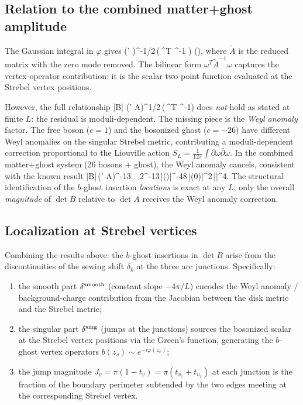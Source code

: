 \documentclass[12pt]{article}
\newcommand{\wt}[1]{\widetilde{#1}}
\begin{document}
\subsection{Relation to the combined matter+ghost amplitude}

The Gaussian integral in $\varphi$ gives
\be
(\det' \wt{A})^{-1/2}\,\exp\!\left(\,\omega^T \wt{A}^{-1} \omega\right)
\times (),
\ee
where $\wt{A}$ is the reduced matrix with the zero mode removed. The bilinear form $\omega^T \wt{A}^{-1}\omega$ captures the vertex-operator contribution: it is the scalar two-point function evaluated at the Strebel vertex positions.

However, the full relationship
\be
|\det B|  (\det' A)^{1/2}\,\exp\!\left(\,\omega^T \wt{A}^{-1}\omega\right)
\ee
does \emph{not} hold as stated at finite $L$: the residual is moduli-dependent. The missing piece is the \emph{Weyl anomaly} factor. The free boson ($c=1$) and the bosonized ghost ($c=-26$) have different Weyl anomalies on the singular Strebel metric, contributing a moduli-dependent correction proportional to the Liouville action $S_L = \frac{1}{12\pi}\int\partial\omega\bar\partial\omega$. In the combined matter+ghost system (26 bosons $+$ ghost), the Weyl anomaly cancels, consistent with the known result
\be
|\det B|\,(\det' A)^{-13} \propto \tau_2^{-13}\,|\eta(\tau)|^{-48}\,|(0)|^2\,|\nu|^4.
\ee
The structural identification of the $b$-ghost insertion \emph{locations} is exact at any $L$; only the overall \emph{magnitude} of $\det B$ relative to $\det A$ receives the Weyl anomaly correction.

\subsection{Localization at Strebel vertices}

Combining the results above: the $b$-ghost insertions in $\det B$ arise from the discontinuities of the sewing shift $\delta_k$ at the three arc junctions. Specifically:
\begin{enumerate}
\item the smooth part $\delta^{\rm smooth}$ (constant slope $-4\pi/L$) encodes the Weyl anomaly / background-charge contribution from the Jacobian between the disk metric and the Strebel metric;
\item the singular part $\delta^{\rm sing}$ (jumps at the junctions) sources the bosonized scalar at the Strebel vertex positions via the Green's function, generating the $b$-ghost vertex operators $b(z_v) \sim e^{-i\varphi(z_v)}$;
\item the jump magnitude $J_v = \pi(1-t_v) = \pi(t_{v_1}+t_{v_2})$ at each junction is the fraction of the boundary perimeter subtended by the two edges meeting at the corresponding Strebel vertex.
\end{enumerate}
\end{document}
